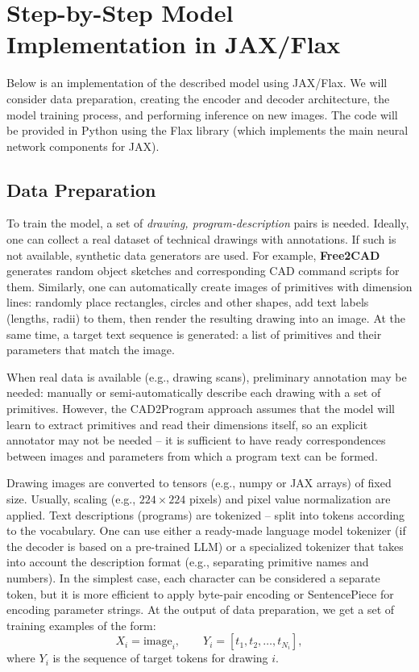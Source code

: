 \documentclass{article}
\begin{document}
\section{Step-by-Step Model Implementation in JAX/Flax}

Below is an implementation of the described model using JAX/Flax. We will consider data preparation, creating the encoder and decoder architecture, the model training process, and performing inference on new images. The code will be provided in Python using the Flax library (which implements the main neural network components for JAX).

\subsection{Data Preparation}

To train the model, a set of {\textit{drawing, program-description}} pairs is needed. Ideally, one can collect a real dataset of technical drawings with annotations. If such is not available, synthetic data generators are used. For example, \textbf{Free2CAD} generates random object sketches and corresponding CAD command scripts for them. Similarly, one can automatically create images of primitives with dimension lines: randomly place rectangles, circles and other shapes, add text labels (lengths, radii) to them, then render the resulting drawing into an image. At the same time, a target text sequence is generated: a list of primitives and their parameters that match the image.

When real data is available (e.g., drawing scans), preliminary annotation may be needed: manually or semi-automatically describe each drawing with a set of primitives. However, the CAD2Program approach assumes that the model will learn to extract primitives and read their dimensions itself, so an explicit annotator may not be needed – it is sufficient to have ready correspondences between images and parameters from which a program text can be formed.

Drawing images are converted to tensors (e.g., numpy or JAX arrays) of fixed size. Usually, scaling (e.g., $224\times224$ pixels) and pixel value normalization are applied. Text descriptions (programs) are tokenized – split into tokens according to the vocabulary. One can use either a ready-made language model tokenizer (if the decoder is based on a pre-trained LLM) or a specialized tokenizer that takes into account the description format (e.g., separating primitive names and numbers). In the simplest case, each character can be considered a separate token, but it is more efficient to apply byte-pair encoding or SentencePiece for encoding parameter strings. At the output of data preparation, we get a set of training examples of the form:
$$X_i = \text{image}_i,\qquad Y_i = [t_1, t_2, \dots, t_{N_i}],$$
where $Y_i$ is the sequence of target tokens for drawing $i$.
\end{document}

